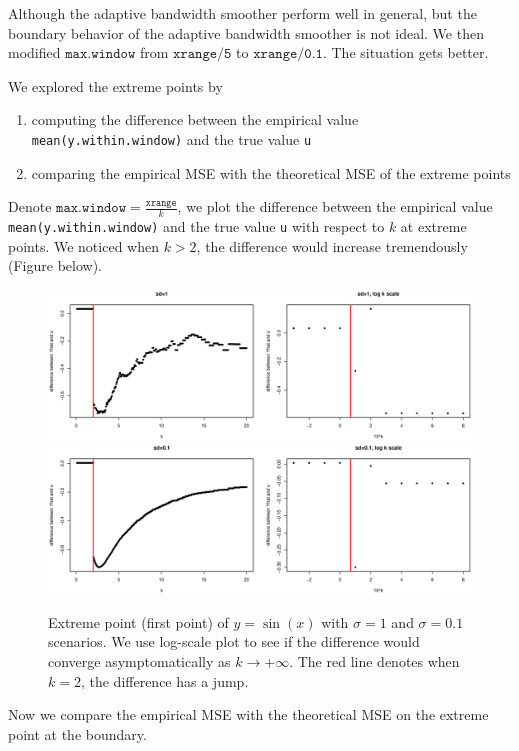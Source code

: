 \documentclass{article}
\begin{document}
\begin{itemize}
Although the adaptive bandwidth smoother perform well in general, but the boundary behavior of the adaptive bandwidth smoother is not ideal. We then modified $\texttt{max.window}$ from $\texttt{xrange/5}$ to $\texttt{xrange/0.1}$. The situation gets better. 

We explored the extreme points by 
\begin{enumerate}
\item computing the difference between the empirical value \texttt{mean(y.within.window)} and the true value \texttt{u}
\item comparing the empirical MSE with the theoretical MSE of the extreme points
\end{enumerate}

Denote $\texttt{max.window} = \frac{\texttt{xrange}}{k}$, we plot the difference between the empirical value \texttt{mean(y.within.window)} and the true value \texttt{u} with respect to $k$ at extreme points. We noticed when $k>2$, the difference would increase tremendously (Figure below).

\begin{figure}[H]
\includegraphics[width=\linewidth]{pic/sim.plot4.eps}
\includegraphics[width=\linewidth]{pic/sim.plot5.eps}
\caption{Extreme point (first point) of $y=\sin(x)$ with $\sigma = 1$ and  $\sigma = 0.1$ scenarios. We use log-scale plot to see if the difference would converge asymptomatically as $k\rightarrow +\infty$. The red line denotes when $k=2$, the difference has a jump.} 
\end{figure}


Now we compare the empirical MSE with the theoretical MSE on the extreme point at the boundary. 


\end{itemize}
\end{document}
